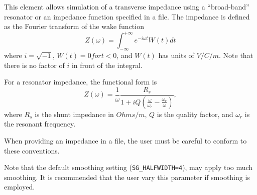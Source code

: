 This element allows simulation of a transverse impedance using a
``broad-band'' resonator or an impedance function specified in a file.
The impedance is defined as the Fourier transform of the wake function
\begin{equation}
Z(\omega) = \int_{-\infty}^{+\infty} e^{-i \omega t} W(t) dt
\end{equation}
where $i = \sqrt{-1}$, $W(t)=0 for t<0$, and $W(t)$ has units of
$V/C/m$.  Note that there is no factor of $i$ in front of the
integral.

For a resonator impedance, the functional form is
\begin{equation}
Z(\omega) = \frac{1}{\omega} \frac{R_s}{1 + iQ(\frac{\omega}{\omega_r} - \frac{\omega_r}{\omega})},
\end{equation}
where $R_s$ is the shunt impedance in $Ohms/m$, $Q$ is the quality
factor, and $\omega_r$ is the resonant frequency.

When providing an impedance in a file, the user must be careful to conform to these
conventions.

Note that the default smoothing setting ({\tt SG\_HALFWIDTH=4}), may apply too much smoothing.
It is recommended that the user vary this parameter if smoothing is employed.
